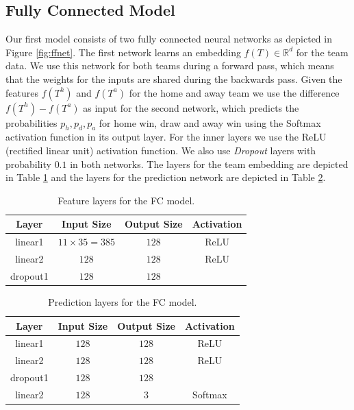 \documentclass[a4paper]{article}
\begin{document}
\subsection{Fully Connected Model}
Our first model consists of two fully connected neural networks as depicted in
Figure \ref{fig:ffnet}. The first network learns an embedding $f(T) \in
\mathbb{R}^d $ for the team data. We use this network for both teams during a
forward pass, which means that the weights for the inputs are shared during the
backwards pass. Given the features $f(T^h)$ and $f(T^a)$ for the home and away
team we use the difference $f(T^h)-f(T^a)$ as input for the second network,
which predicts the probabilities $p_h, p_d, p_a$ for home win, draw and away win
using the Softmax activation function in its output layer. For the inner layers
we use the ReLU (rectified linear unit) activation function. We also use
\textit{Dropout} \cite{Dropout14} layers with probability $0.1$ in both
networks. The layers for the team embedding are depicted in Table
\ref{tab:flayer} and the layers for the prediction network are depicted in Table
\ref{tab:player}.
 
\begin{table}
\begin{tabular}{|c|c|c|c|}
\hline 
\textbf{Layer} & \textbf{Input Size} & \textbf{Output Size} & \textbf{Activation} \\ 
\hline 	
\hline
linear1 & $11 \times 35=385$ & $128$ & ReLU \\ 
\hline 
linear2 & $128$ & $128$ & ReLU \\ 
\hline 
dropout1 & $128$ & $128$ &  \\ 
\hline 
\end{tabular} 
\caption{Feature layers for the FC model.}
\label{tab:flayer}
\end{table}

\begin{table}
\begin{tabular}{|c|c|c|c|}
\hline 
\textbf{Layer} & \textbf{Input Size} & \textbf{Output Size} & \textbf{Activation} \\ 
\hline 	
\hline
linear1 & $128$ & $128$ & ReLU \\ 
\hline 
linear2 & $128$ & $128$ & ReLU \\ 
\hline 
dropout1 & $128$ & $128$ &  \\ 
\hline 
linear2 & $128$ & $3$ & Softmax \\ 
\hline
\end{tabular} 
\caption{Prediction layers for the FC model.}
\label{tab:player}
\end{table}
\end{document}
